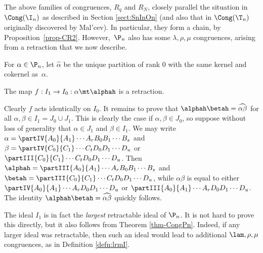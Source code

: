 The above families of congruences, $R_q$ and $R_N$, closely parallel the situation in  $\Cong(\I_n)$
as described in Section \ref{sect:SnInOn}
(and also that in $\Cong(\T_n)$ originally discovered by Mal$'$cev).
In particular, they form a chain, by Proposition~\ref{prop-CR2}.
However,~$\P_n$ also has some $\lambda,\rho,\mu$ congruences, arising from a retraction that we now describe.


\begin{defn}
\label{defn:hat}
For $\alpha\in\P_n$, let $\widehat{\alpha}$ be the unique partition of rank $0$ with the same kernel and cokernel as~$\alpha$.~
\end{defn}


\begin{lemma}
\label{HatRetract}
The map $f: I_1\rightarrow I_0:\alpha\mt\alphah$ is a retraction.
\end{lemma}

\pf
Clearly $f$ acts identically on $I_0$.  It remains to prove that $\alphah\betah=\widehat{\alpha\beta}$ for all ${\alpha,\beta\in I_1=J_0\cup J_1}$.  This is clearly the case if ${\alpha,\beta\in J_0}$, so suppose without loss of generality that $\alpha\in J_1$ and $\beta\in I_1$.  We may write $\alpha=\partIV{A_0}{A_1}\cdots{A_r}{B_0}{B_1}\cdots{B_s}$ and $\beta=\partIV{C_0}{C_1}\cdots{C_t}{D_0}{D_1}\cdots{D_u}$ or $\partIII{C_0}{C_1}\cdots{C_t}{D_0}{D_1}\cdots{D_u}$.  Then $\alphah=\partIII{A_0}{A_1}\cdots{A_r}{B_0}{B_1}\cdots{B_s}$ and $\betah = \partIII{C_0}{C_1}\cdots{C_t}{D_0}{D_1}\cdots{D_u}$, while $\alpha\beta$ is equal to either $\partIV{A_0}{A_1}\cdots{A_r}{D_0}{D_1}\cdots{D_u}$ or $\partIII{A_0}{A_1}\cdots{A_r}{D_0}{D_1}\cdots{D_u}$.  The identity $\alphah\betah=\widehat{\alpha\beta}$ quickly follows. \epf

The ideal $I_1$ is in fact the \emph{largest} retractable ideal of $\P_n$.  It is not hard to prove this directly, but it also follows from Theorem \ref{thm-CongPn}.  Indeed, if any larger ideal was retractable, then such an ideal would lead to additional $\lam,\rho,\mu$ congruences, as in Definition \ref{defn:lrmI}.





